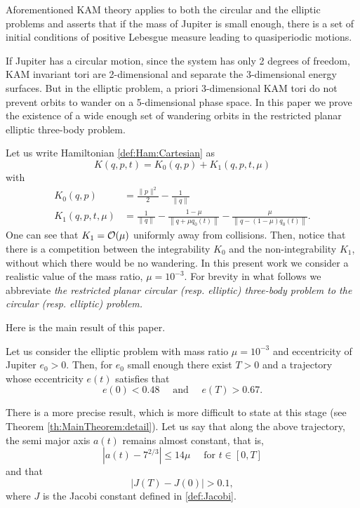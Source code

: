 Aforementioned KAM theory applies to both the circular and the
elliptic problems \cite{Arnold:1963, SiegelM95} and asserts that if
the mass of Jupiter is small enough, there is a set of initial
conditions of positive Lebesgue measure leading to quasiperiodic
motions.

If Jupiter has a circular motion, since the system has only 2 degrees
of freedom, KAM invariant tori are 2-dimensional and separate the
3-dimensional energy surfaces.  But in the elliptic problem, a priori
3-dimensional KAM tori do not prevent orbits to wander on a
5-dimensional phase space. In this paper we prove the existence of a
wide enough set of wandering orbits in the restricted planar elliptic
three-body problem.

Let us write Hamiltonian \eqref{def:Ham:Cartesian} as
\[
K(q,p,t)=K_0(q,p)+K_1(q,p,t,\mu)
\]
with
\[
\begin{split}
  K_0(q,p)&=\frac{\|p\|^2}{2}-\frac{1}{\|q\|}\\
  K_1(q,p,t,\mu)&=\frac{1}{\|q\|}-\frac{1-\mu}{\left\|q+\mu q_0(t)\right\|}
  -\frac{\mu}{\left\|q-(1-\mu)q_0(t)\right\|}.
\end{split}
\]
One can see that $K_1=\mathcal{O}(\mu)$ uniformly away from collisions. Then,
notice that there is a competition between the integrability $K_0$ and
the non-integrability $K_1$, without which there would be no
wandering. In this present work we consider a realistic value of the
mass ratio, $\mu=10^{-3}$.
For brevity in what follows we abbreviate {\it the restricted planar
circular (resp. elliptic) three-body problem
to the circular (resp. elliptic) problem.}


Here is the main result of this paper.

\begin{theorem}\label{MainTheorem:Intro}
  Let us consider the elliptic problem
  with mass ratio $\mu=10^{-3}$ and eccentricity of Jupiter
  $e_0>0$. Then, for $e_0$ small enough there exist $T>0$ and a
  trajectory whose eccentricity $e(t)$ satisfies that
  \[
  e(0)< 0.48\quad\text{ and }\quad e(T)>0.67.
  \]
\end{theorem}

There is a more precise result, which is more difficult to state at
this stage (see Theorem \ref{th:MainTheorem:detail}). Let us say
that along the above trajectory, the semi major axis $a(t)$ remains
almost constant, that is,
\[|a(t)-7^{2/3}|\leq 14\mu\quad\text{ for }t\in [0,T] \]
and that
\[
\left|J(T)-J(0)\right|>0.1,
\]
where $J$ is the Jacobi constant defined in \eqref{def:Jacobi}.

